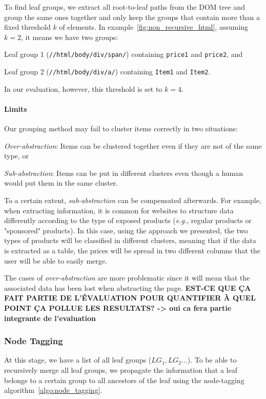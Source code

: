 To find leaf groups, we extract all root-to-leaf paths from the DOM tree and group the same ones together
and only keep the groups that contain more than a fixed threshold $k$ of elements.
In example~\ref{fig:non_recursive_html}, assuming $k=2$, it means we have two groups:
\begin{compactenum}
  \item Leaf group 1 (\texttt{//html/body/div/span/}) containing \texttt{price1} and \texttt{price2}, and
  \item Leaf group 2 (\texttt{//html/body/div/a/}) containing \texttt{Item1} and \texttt{Item2}.
\end{compactenum}
In our evaluation, however, this threshold is set to $k=4$.

\paragraph{Limits}
Our grouping method may fail to cluster items correctly in two situations:
\begin{compactitem}
  \item \emph{Over-abstraction}: Items can be clustered together even if they are not of the same type, or
  \item \emph{Sub-abstraction}: Items can be put in different clusters even though a human would put them in the same cluster.
\end{compactitem}
To a certain extent, \emph{sub-abstraction} can be compensated afterwards.
For example, when extracting information, it is common for websites to structure data differently according to the type of exposed products (\emph{e.g.}, regular products or "sponsored" products). 
In this case, using the approach we presented, the two types of products will be classified in different clusters, meaning that if the data is extracted as a table, the prices will be spread in two different columns that the user will be able to easily merge.

The cases of \emph{over-abstraction} are more problematic since it will mean that the associated data has been lost when abstracting the page.
\textbf{EST-CE QUE ÇA FAIT PARTIE DE L'ÉVALUATION POUR QUANTIFIER À QUEL POINT ÇA POLLUE LES RESULTATS? -> oui ca fera partie integrante de l'evaluation}

\subsubsection{Node Tagging}
\label{appstract:sec:node_tagging}
At this stage, we have a list of all leaf groups ($LG_1, LG_2...$). 
To be able to recursively merge all leaf groups, we propagate the information that a leaf belongs to a certain group to all ancestors of the leaf using the node-tagging algorithm~\ref{algo:node_tagging}.

